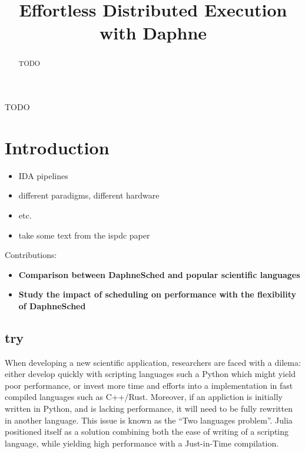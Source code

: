 \documentclass[conference,10pt,a4paper]{IEEEtran}
\begin{document}
\title{Effortless Distributed Execution with Daphne}

\author{
}

\maketitle
\thispagestyle{plain}
\pagestyle{plain}

\begin{abstract}
  TODO
\end{abstract}

\begin{IEEEkeywords}
TODO
\end{IEEEkeywords}

\section{Introduction}

\begin{itemize}
\item IDA pipelines
\item different paradigms, different hardware
\item etc.
\item take some text from the ispdc paper
\end{itemize}

Contributions:

\begin{itemize}
\item \textbf{Comparison between DaphneSched and popular scientific languages}
\item \textbf{Study the impact of scheduling on performance with the flexibility of DaphneSched}
\end{itemize}

\subsection{try}


When developing a new scientific application, researchers are faced with a dilema:
either develop quickly with scripting languages such a Python which might yield poor performance,
or invest more time and efforts into a implementation in fast compiled languages such as C++/Rust.
Moreover, if an appliction is initially written in Python, and is lacking performance, it will need to be fully rewritten in another language.
This issue is known as the ``Two languages problem''.
Julia \cite{bezanson2012julia} positioned itself as a solution combining both the ease of writing of a scripting language, while yielding high performance with a Just-in-Time compilation.
\end{document}
